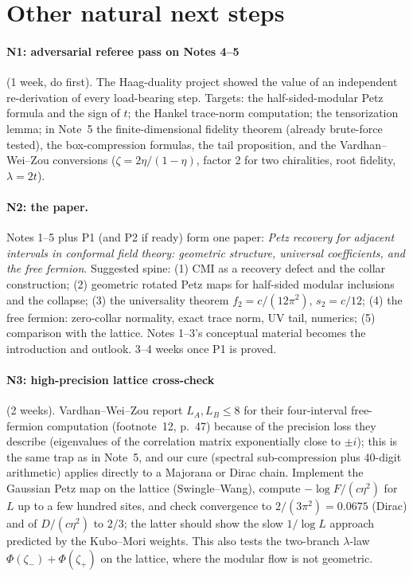 \documentclass[11pt]{article}
\theoremstyle{accent}
\theoremstyle{definition}
\begin{document}
\section{Other natural next steps}\label{sec:next}

\paragraph{N1: adversarial referee pass on Notes 4--5} (1 week, do first).  The Haag-duality project showed the value of an independent re-derivation of every load-bearing step.  Targets: the half-sided-modular Petz formula and the sign of \(t\); the Hankel trace-norm computation; the tensorization lemma; in Note~5 the finite-dimensional fidelity theorem (already brute-force tested), the box-compression formulas, the tail proposition, and the Vardhan--Wei--Zou conversions (\(\zeta=2\eta/(1-\eta)\), factor 2 for two chiralities, root fidelity, \(\lambda=2t\)).

\paragraph{N2: the paper.}
Notes 1--5 plus P1 (and P2 if ready) form one paper: \emph{Petz recovery for adjacent intervals in conformal field theory: geometric structure, universal coefficients, and the free fermion}.  Suggested spine: (1) CMI as a recovery defect and the collar construction; (2) geometric rotated Petz maps for half-sided modular inclusions and the collapse; (3) the universality theorem \(f_2=c/(12\pi^2)\), \(s_2=c/12\); (4) the free fermion: zero-collar normality, exact trace norm, UV tail, numerics; (5) comparison with the lattice.  Notes 1--3's conceptual material becomes the introduction and outlook.  3--4 weeks once P1 is proved.

\paragraph{N3: high-precision lattice cross-check} (2 weeks).
Vardhan--Wei--Zou report \(L_A,L_B\le8\) for their four-interval free-fermion computation (footnote~12, p.~47) because of the precision loss they describe (eigenvalues of the correlation matrix exponentially close to \(\pm i\)); this is the same trap as in Note~5, and our cure (spectral sub-compression plus 40-digit arithmetic) applies directly to a Majorana or Dirac chain.  Implement the Gaussian Petz map on the lattice (Swingle--Wang), compute \(-\log F/(c\eta^2)\) for \(L\) up to a few hundred sites, and check convergence to \(2/(3\pi^2)=0.0675\) (Dirac) and of \(D/(c\eta^2)\) to \(2/3\); the latter should show the slow \(1/\log L\) approach predicted by the Kubo--Mori weights.  This also tests the two-branch \(\lambda\)-law \(\Phi(\zeta_-)+\Phi(\zeta_+)\) on the lattice, where the modular flow is not geometric.
\end{document}
